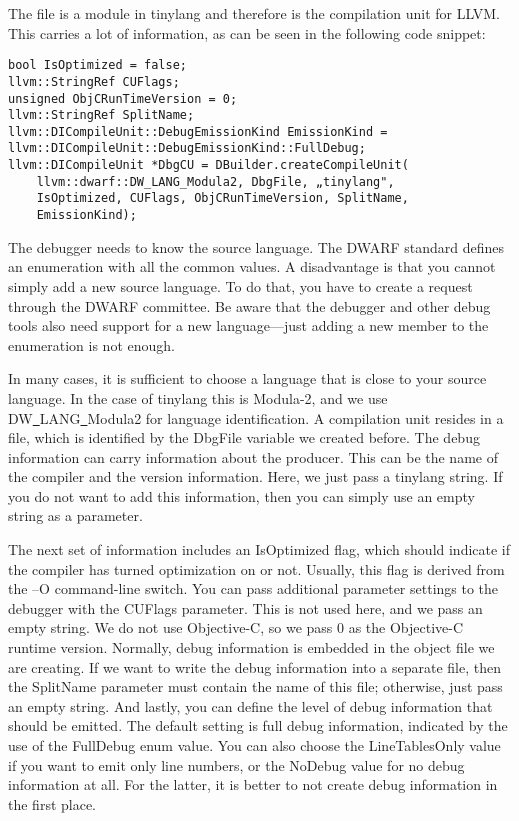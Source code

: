 The file is a module in tinylang and therefore is the compilation unit for LLVM. This carries a lot of information, as can be seen in the following code snippet:\par

\begin{lstlisting}[caption={}]
bool IsOptimized = false;
llvm::StringRef CUFlags;
unsigned ObjCRunTimeVersion = 0;
llvm::StringRef SplitName;
llvm::DICompileUnit::DebugEmissionKind EmissionKind =
llvm::DICompileUnit::DebugEmissionKind::FullDebug;
llvm::DICompileUnit *DbgCU = DBuilder.createCompileUnit(
	llvm::dwarf::DW_LANG_Modula2, DbgFile, „tinylang",
	IsOptimized, CUFlags, ObjCRunTimeVersion, SplitName,
	EmissionKind);
\end{lstlisting}

The debugger needs to know the source language. The DWARF standard defines an enumeration with all the common values. A disadvantage is that you cannot simply add a new source language. To do that, you have to create a request through the DWARF committee. Be aware that the debugger and other debug tools also need support for a new language—just adding a new member to the enumeration is not enough.\par

In many cases, it is sufficient to choose a language that is close to your source language. In the case of tinylang this is Modula-2, and we use DW\underline{~}LANG\underline{~}Modula2 for language identification. A compilation unit resides in a file, which is identified by the DbgFile variable we created before. The debug information can carry information about the producer. This can be the name of the compiler and the version information. Here, we just pass a tinylang string. If you do not want to add this information, then you can simply use an empty string as a parameter.\par

The next set of information includes an IsOptimized flag, which should indicate if the compiler has turned optimization on or not. Usually, this flag is derived from the –O command-line switch. You can pass additional parameter settings to the debugger with the CUFlags parameter. This is not used here, and we pass an empty string. We do not use Objective-C, so we pass 0 as the Objective-C runtime version. Normally, debug information is embedded in the object file we are creating. If we want to write the debug information into a separate file, then the SplitName parameter must contain the name of this file; otherwise, just pass an empty string. And lastly, you can define the level of debug information that should be emitted. The default setting is full debug information, indicated by the use of the FullDebug enum value. You can also choose the LineTablesOnly value if you want to emit only line numbers, or the NoDebug value for no debug information at all. For the latter, it is better to not create debug information in the first place.\par

